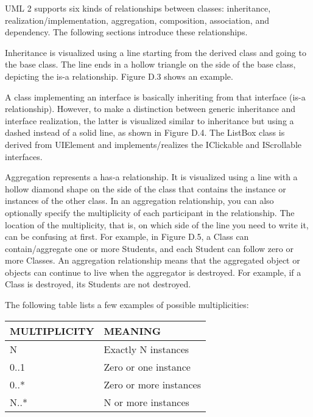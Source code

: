 UML 2 supports six kinds of relationships between classes: inheritance, realization/implementation, aggregation, composition, association, and dependency. The following sections introduce these relationships.


Inheritance is visualized using a line starting from the derived class and going to the base class. The line ends in a hollow triangle on the side of the base class, depicting the is-a relationship. Figure D.3 shows an example.



A class implementing an interface is basically inheriting from that interface (is-a relationship). However, to make a distinction between generic inheritance and interface realization, the latter is visualized similar to inheritance but using a dashed instead of a solid line, as shown in Figure D.4. The ListBox class is derived from UIElement and implements/realizes the IClickable and IScrollable interfaces.



Aggregation represents a has-a relationship. It is visualized using a line with a hollow diamond shape on the side of the class that contains the instance or instances of the other class. In an aggregation relationship, you can also optionally specify the multiplicity of each participant in the relationship. The location of the multiplicity, that is, on which side of the line you need to write it, can be confusing at first. For example, in Figure D.5, a Class can contain/aggregate one or more Students, and each Student can follow zero or more Classes. An aggregation relationship means that the aggregated object or objects can continue to live when the aggregator is destroyed. For example, if a Class is destroyed, its Students are not destroyed.


The following table lists a few examples of possible multiplicities:

\begin{longtable}{|l|l|}
\hline
\textbf{MULTIPLICITY} & \textbf{MEANING}       \\ \hline
\endfirsthead
%
\endhead
%
N                     & Exactly N instances    \\ \hline
0..1                  & Zero or one instance   \\ \hline
0..*                  & Zero or more instances \\ \hline
N..*                  & N or more instances    \\ \hline
\end{longtable}

